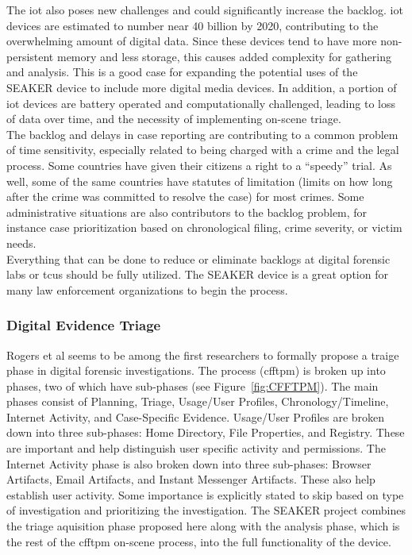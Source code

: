 \documentclass[12pt]{article}
\begin{document}
The \gls{iot} also poses new challenges and could significantly
increase the backlog.  \gls{iot} devices are estimated to number near 40 billion by
2020, contributing to the overwhelming amount of digital data.  Since these devices
tend to have more non-persistent memory and less storage, this causes added
complexity for gathering and analysis.  This is a good case for expanding the 
potential uses of the SEAKER device to include more digital media devices.
In addition, a portion of \gls{iot} devices are battery operated and computationally
challenged, leading to loss of data over time, and the necessity of implementing
on-scene triage.\\

The backlog and delays in case reporting are contributing to a common problem of
time sensitivity\cite{hitchcock2016tiered}, especially related to being charged
with a crime and the legal process.  Some countries have given their citizens a
right to a ``speedy'' trial.  As well, some of the same countries have statutes
of limitation (limits on how long after the crime was committed to resolve the
case) for most crimes.  Some administrative situations are also contributors to
the backlog problem, for instance case prioritization based on chronological
filing, crime severity, or victim needs.\\

Everything that can be done to reduce or eliminate backlogs at digital forensic labs
or \glspl{tcu} should be fully utilized.  The SEAKER device is a great option for
many law enforcement organizations to begin the process.\\

\subsubsection{Digital Evidence Triage}

Rogers et al\cite{rogers2006computer} seems to be among the first researchers to 
formally propose a traige phase in digital forensic investigations.  The process 
(\gls{cfftpm}) is broken up into phases, two of which have sub-phases (see
Figure~\ref{fig:CFFTPM}).  The main phases consist of Planning, Triage, Usage/User
Profiles, Chronology/Timeline, Internet Activity, and Case-Specific Evidence.
Usage/User Profiles are broken down into three sub-phases: Home Directory, File
Properties, and Registry.  These are important and help distinguish user specific
activity and permissions.  The Internet Activity phase is also broken down into three
sub-phases: Browser Artifacts, Email Artifacts, and Instant Messenger Artifacts.
These also help establish user activity.  Some importance is explicitly stated to skip
based on type of investigation and prioritizing the investigation.  The SEAKER
project combines the triage aquisition phase proposed here along with the analysis
phase, which is the rest of the \gls{cfftpm} on-scene process, into the full functionality
of the device.\\ 
\end{document}
